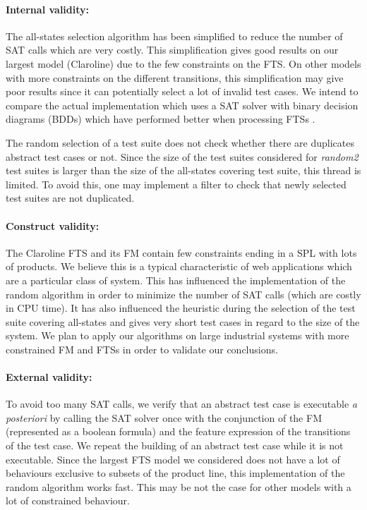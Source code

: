\paragraph{Internal validity:}

The all-states selection algorithm has been simplified to reduce the number of SAT calls which are very costly. This simplification gives good results on our largest model (Claroline) due to the few constraints on the FTS. On other models with more constraints on the different transitions, this simplification may give poor results since it can potentially select a lot of invalid test cases. We intend to compare the actual implementation which uses a SAT solver with binary decision diagrams (BDDs) which have performed better when processing FTSs \cite{Classen2011}.

The random selection of a test suite does not check whether there are duplicates abstract test cases or not. Since the size of the test suites considered for \textit{random2} test suites is larger than the size of the all-states covering test suite, this thread is limited. To avoid this, one may implement a filter to check that newly selected test suites are not duplicated.

\paragraph{Construct validity:}

The Claroline FTS and its FM contain few constraints ending in a SPL with lots of products. We believe this is a typical characteristic of web applications which are a particular class of system. This has influenced the implementation of the random algorithm in order to minimize the number of SAT calls (which are costly in CPU time). It has also influenced the heuristic during the selection of the test suite covering all-states and gives very short test cases in regard to the size of the system. We plan to apply our algorithms on large industrial systems with more constrained FM and FTSs in order to validate our conclusions.

\paragraph{External validity:}

To avoid too many SAT calls, we verify that an abstract test case is executable \textit{a posteriori} by calling the SAT solver once with the conjunction of the FM (represented as a boolean formula) and the feature expression of the transitions of the test case. We repeat the building of an abstract test case while it is not executable. Since the largest FTS model we considered does not have a lot of behaviours exclusive to subsets of the product line, this implementation of the random algorithm works fast. This may be not the case for other models with a lot of constrained behaviour.

